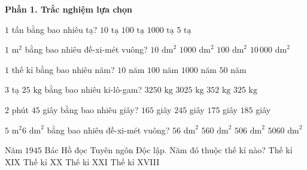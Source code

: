 \textbf{Phần 1. Trắc nghiệm lựa chọn}

\begin{ex} %
$1$ tấn bằng bao nhiêu tạ?
\choice
{\True $10\text{ tạ}$}
{$100\text{ tạ}$}
{$1000\text{ tạ}$}
{$5\text{ tạ}$}
\end{ex}

\begin{ex} %
$1\text{ m}^2$ bằng bao nhiêu đề-xi-mét vuông?
\choice
{$10\text{ dm}^2$}
{$1000\text{ dm}^2$}
{\True $100\text{ dm}^2$}
{$10\,000\text{ dm}^2$}
\end{ex}

\begin{ex} %
$1$ thế kỉ bằng bao nhiêu năm?
\choice
{$10$ năm}
{\True $100$ năm}
{$1000$ năm}
{$50$ năm}
\end{ex}

\begin{ex} %
$3$ tạ $25\text{ kg}$ bằng bao nhiêu ki-lô-gam?
\choice
{$3250\text{ kg}$}
{$3025\text{ kg}$}
{$352\text{ kg}$}
{\True $325\text{ kg}$}
\end{ex}

\begin{ex} %
$2$ phút $45$ giây bằng bao nhiêu giây?
\choice
{\True $165$ giây}
{$245$ giây}
{$175$ giây}
{$185$ giây}
\end{ex}

\begin{ex} %
$5\text{ m}^2 6\text{ dm}^2$ bằng bao nhiêu đề-xi-mét vuông?
\choice
{$56\text{ dm}^2$}
{$560\text{ dm}^2$}
{\True $506\text{ dm}^2$}
{$5060\text{ dm}^2$}
\end{ex}

\begin{ex} %
Năm $1945$ Bác Hồ đọc Tuyên ngôn Độc lập. Năm đó thuộc thế kỉ nào?
\choice
{Thế kỉ XIX}
{\True Thế kỉ XX}
{Thế kỉ XXI}
{Thế kỉ XVIII}
\end{ex}

